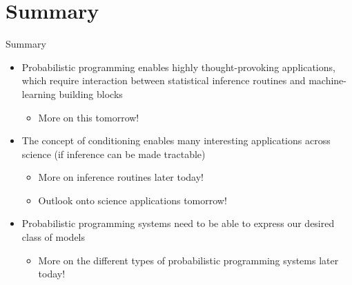 \documentclass[AERbeamer%
              ,optEnglish%
              ,optBiber%
              ,optBibstyleAlphabetic%
              ,optBeamerClassicFormat%
              ]{AERlatex}%
\begin{document}
\section{Summary}
\begin{frame}[c]{Summary}
    \centering
    \begin{itemize}
        \item Probabilistic programming enables highly thought-provoking applications, which require interaction
              between statistical inference routines and machine-learning building blocks
        \begin{itemize}
            \item More on this tomorrow!
        \end{itemize}
        \item The concept of conditioning enables many interesting applications across science (if inference can be made tractable)
        \begin{itemize}
            \item More on inference routines later today!
            \item Outlook onto science applications tomorrow!
        \end{itemize}
        \item Probabilistic programming systems need to be able to express our desired class of models
        \begin{itemize}
            \item More on the different types of probabilistic programming systems later today!
        \end{itemize}
    \end{itemize}
\end{frame}





%
%
%
%
\end{document}
